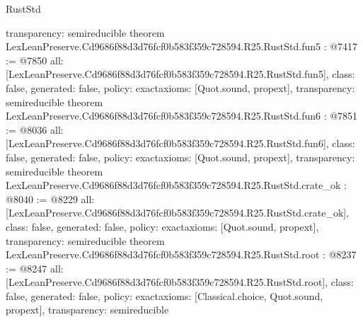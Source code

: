 \begin{lexlean}{RustStd}
\begin{coremodule}
{  transparency: semireducible
}
theorem LexLeanPreserve.Cd9686f88d3d76fcf0b583f359c728594.R25.RustStd.fun5 : @7417 := @7850 {
  all: [LexLeanPreserve.Cd9686f88d3d76fcf0b583f359c728594.R25.RustStd.fun5],
  class: false,
  generated: false,
  policy: exact{axioms: [Quot.sound, propext]},
  transparency: semireducible
}
theorem LexLeanPreserve.Cd9686f88d3d76fcf0b583f359c728594.R25.RustStd.fun6 : @7851 := @8036 {
  all: [LexLeanPreserve.Cd9686f88d3d76fcf0b583f359c728594.R25.RustStd.fun6],
  class: false,
  generated: false,
  policy: exact{axioms: [Quot.sound, propext]},
  transparency: semireducible
}
theorem LexLeanPreserve.Cd9686f88d3d76fcf0b583f359c728594.R25.RustStd.crate_ok : @8040 := @8229 {
  all: [LexLeanPreserve.Cd9686f88d3d76fcf0b583f359c728594.R25.RustStd.crate_ok],
  class: false,
  generated: false,
  policy: exact{axioms: [Quot.sound, propext]},
  transparency: semireducible
}
theorem LexLeanPreserve.Cd9686f88d3d76fcf0b583f359c728594.R25.RustStd.root : @8237 := @8247 {
  all: [LexLeanPreserve.Cd9686f88d3d76fcf0b583f359c728594.R25.RustStd.root],
  class: false,
  generated: false,
  policy: exact{axioms: [Classical.choice, Quot.sound, propext]},
  transparency: semireducible
}


\end{coremodule}
\end{lexlean}
